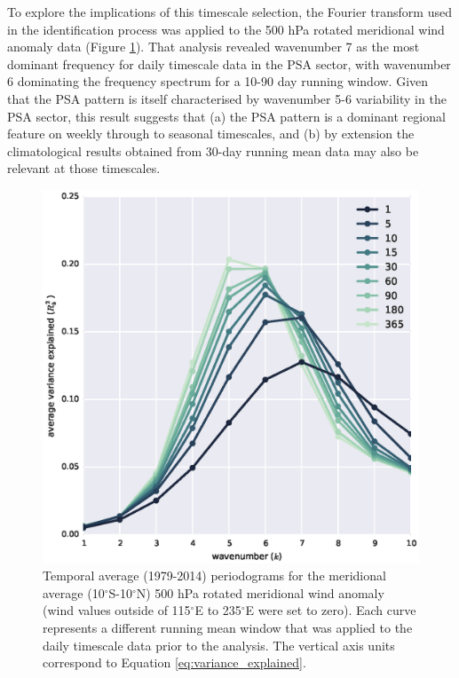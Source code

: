 To explore the implications of this timescale selection, the Fourier transform used in the identification process was applied to the 500 hPa rotated meridional wind anomaly data (Figure \ref{fig:periodogram}). That analysis revealed wavenumber 7 as the most dominant frequency for daily timescale data in the PSA sector, with wavenumber 6 dominating the frequency spectrum for a 10-90 day running window. Given that the PSA pattern is itself characterised by wavenumber 5-6 variability in the PSA sector, this result suggests that (a) the PSA pattern is a dominant regional feature on weekly through to seasonal timescales, and (b) by extension the climatological results obtained from 30-day running mean data may also be relevant at those timescales.

\begin{figure}
\begin{center}
\includegraphics[width=0.7\columnwidth]{figures/psa/vrot-r2spectrum_ERAInterim_500hPa_daily-anom-wrt-all_native-np20N260E.eps}
\caption[Temporal average (1979-2014) periodograms for the meridional average (10$^{\circ}$S-10$^{\circ}$N) 500 hPa rotated meridional wind anomaly]{\label{fig:periodogram}
Temporal average (1979-2014) periodograms for the meridional average (10$^{\circ}$S-10$^{\circ}$N) 500 hPa rotated meridional wind anomaly (wind values outside of 115$^{\circ}$E to 235$^{\circ}$E were set to zero). Each curve represents a different running mean window that was applied to the daily timescale data prior to the analysis. The vertical axis units correspond to Equation \ref{eq:variance_explained}.%
}
\end{center}
\end{figure}



